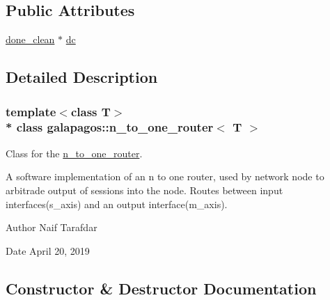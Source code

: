 \subsection*{Public Attributes}
\begin{DoxyCompactItemize}
\item 
\hyperlink{classgalapagos_1_1done__clean}{done\+\_\+clean} $\ast$ \hyperlink{classgalapagos_1_1n__to__one__router_a42603cc4ee2ee8391a7d0e14bb1f39df}{dc}
\end{DoxyCompactItemize}


\subsection{Detailed Description}
\subsubsection*{template$<$class T$>$\\*
class galapagos\+::n\+\_\+to\+\_\+one\+\_\+router$<$ T $>$}

Class for the \hyperlink{classgalapagos_1_1n__to__one__router}{n\+\_\+to\+\_\+one\+\_\+router}. 

A software implementation of an n to one router, used by network node to arbitrade output of sessions into the node. Routes between input interfaces(s\+\_\+axis) and an output interface(m\+\_\+axis). \begin{DoxyAuthor}{Author}
Naif Tarafdar 
\end{DoxyAuthor}
\begin{DoxyDate}{Date}
April 20, 2019 
\end{DoxyDate}


\subsection{Constructor \& Destructor Documentation}
